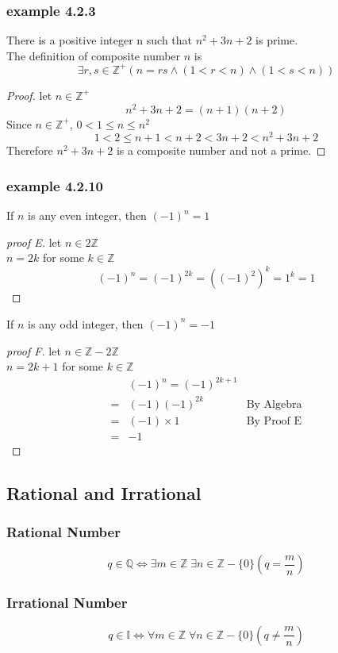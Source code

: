 \documentclass[12pt]{book}
\newcommand{\Z}{\mathbb{Z}}
\newcommand{\Q}{\mathbb{Q}}
\newcommand{\paren}[1]{\left( #1 \right)}
\newcommand{\defcomp}{\exists r,s\in \Z^+ \paren{n=rs \wedge \paren{1<r<n} \wedge \paren{1<s<n}}}
\begin{document}
\subsubsection{example 4.2.3}
There is a positive integer n such that $n^2+3n+2$ is prime.\\
The definition of composite number $n$ is
\[
\defcomp
\]
\begin{proof}
    let $n \in \Z^+$\\
    \[
    n^2+3n+2=(n+1)(n+2)
    \]
    Since $n\in \Z^+$, $0<1\leq n \leq n^2$
    \[
    1<2\leq n+1 < n+2 < 3n+2 < n^2 +3n +2
    \]
    Therefore $n^2 +3n +2$ is a composite number and not a prime.
\end{proof}

\subsubsection{example 4.2.10}
If $n$ is any even integer, then $(-1)^n=1$
\begin{proof}[proof E]
    let $ n \in 2\Z$\\
    $n=2k$ for some $k \in \Z$\\
    \[
    (-1)^n = (-1)^{2k} = \paren{\paren{-1}^2}^k = 1^k = 1
    \]
\end{proof}
If $n$ is any odd integer, then $(-1)^n=-1$
\begin{proof}[proof F]
    let $n \in \Z - 2\Z$\\
    $n = 2k+1$ for some $k \in \Z$
    \begin{align*}
    &(-1)^n = (-1)^{2k+1} \\
    =& (-1)(-1)^{2k} & \text{By Algebra}\\
    =& (-1) \times 1 &\text{By Proof E}\\
    =&-1
    \end{align*}
    
\end{proof}

\subsection{Rational and Irrational}
\subsubsection{Rational Number}
\[
q\in \Q \iff \exists m\in \Z \; \exists n \in \Z - \{0\}
\paren{q = \frac{m}{n}}
\]
\subsubsection{Irrational Number}
\[
q \in \mathbb{I} \iff \forall m \in \Z \; \forall n \in \Z - \{0\}
\paren{q\neq \frac{m}{n}}
\]
\end{document}
